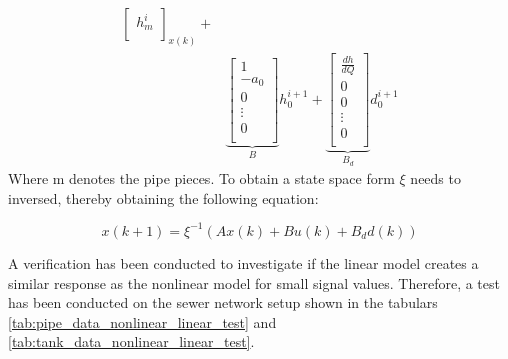 \begin{equation}
\begin{aligned}
{\begin{bmatrix}
		h_{m}^{i}\\
		\end{bmatrix}}_{x(k)}
	+ \\ & \underbrace{\begin{bmatrix}
		 1\\
		 -a_0 \\
		 0\\
		 \vdots \\
		 0\\
		\end{bmatrix}}_{B}
		h_0^{i+1}
		+ 
		\underbrace{\begin{bmatrix}
		 \frac{dh}{dQ}\\
		 0 \\
		 0\\
		 \vdots \\
		 0\\
		\end{bmatrix}}_{B_d}
		d_{0}^{i+1}
	\end{aligned}
\end{equation}
Where m denotes the pipe pieces.  
To obtain a state space form $\xi$ needs to inversed, thereby obtaining the following equation:

\begin{equation}
	x(k+1) = \xi^{-1} (Ax(k)+Bu(k)+B_dd(k))
\end{equation}





A verification has been conducted to investigate if the linear model creates a similar response as the nonlinear model for small signal values. Therefore, a test has been conducted on the sewer network setup shown in the tabulars \ref{tab:pipe_data_nonlinear_linear_test} and \ref{tab:tank_data_nonlinear_linear_test}.

